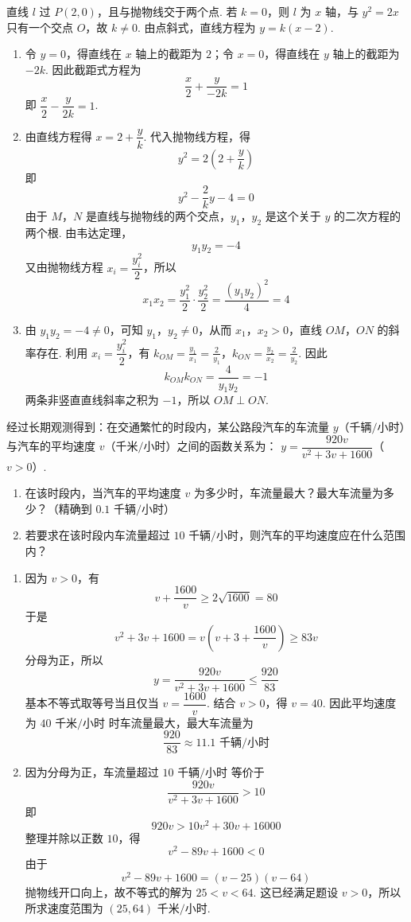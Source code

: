 \begin{solution}
直线 \(l\) 过 \(P(2,0)\)，且与抛物线交于两个点. 若 \(k=0\)，则 \(l\) 为 \(x\) 轴，与 \(y^2=2x\) 只有一个交点 \(O\)，故 \(k\ne0\). 由点斜式，直线方程为 \(y=k(x-2)\).

\begin{enumerate}
\item 令 \(y=0\)，得直线在 \(x\) 轴上的截距为 \(2\)；令 \(x=0\)，得直线在 \(y\) 轴上的截距为 \(-2k\). 因此截距式方程为
\[
\frac{x}{2}+\frac{y}{-2k}=1
\]
即 \(\dfrac{x}{2}-\dfrac{y}{2k}=1\).
\item 由直线方程得 \(x=2+\dfrac{y}{k}\). 代入抛物线方程，得
\[
y^2=2\left(2+\frac{y}{k}\right)
\]
即
\[
y^2-\frac{2}{k}y-4=0
\]
由于 \(M\)，\(N\) 是直线与抛物线的两个交点，\(y_1\)，\(y_2\) 是这个关于 \(y\) 的二次方程的两个根. 由韦达定理，
\[
y_1y_2=-4
\]
又由抛物线方程 \(x_i=\dfrac{y_i^2}{2}\)，所以
\[
x_1x_2=\frac{y_1^2}{2}\cdot\frac{y_2^2}{2}=\frac{(y_1y_2)^2}{4}=4
\]
\item 由 \(y_1y_2=-4\ne0\)，可知 \(y_1\)，\(y_2\ne0\)，从而 \(x_1\)，\(x_2>0\)，直线 \(OM\)，\(ON\) 的斜率存在. 利用 \(x_i=\dfrac{y_i^2}{2}\)，有
\(k_{OM}=\frac{y_1}{x_1}=\frac{2}{y_1}\)，\(k_{ON}=\frac{y_2}{x_2}=\frac{2}{y_2}\).
因此
\[
k_{OM}k_{ON}=\frac{4}{y_1y_2}=-1
\]
两条非竖直直线斜率之积为 \(-1\)，所以 \(OM\perp ON\).
\end{enumerate}
\end{solution}

\begin{problem}
经过长期观测得到：在交通繁忙的时段内，某公路段汽车的车流量 \(y\)（\(\text{千辆/小时}\)）与汽车的平均速度 \(v\)（\(\text{千米/小时}\)）之间的函数关系为：
\(y=\dfrac{920v}{v^2+3v+1600}\)（\(v>0\)）.

\begin{enumerate}
\item 在该时段内，当汽车的平均速度 \(v\) 为多少时，车流量最大？最大车流量为多少？（精确到 \(0.1\text{ 千辆/小时}\)）
\item 若要求在该时段内车流量超过 \(10\text{ 千辆/小时}\)，则汽车的平均速度应在什么范围内？
\end{enumerate}
\end{problem}

\begin{solution}
\begin{enumerate}
\item 因为 \(v>0\)，有
\[
v+\frac{1600}{v}\geq2\sqrt{1600}=80
\]
于是
\[
v^2+3v+1600=v\left(v+3+\frac{1600}{v}\right)\geq83v
\]
分母为正，所以
\[
y=\frac{920v}{v^2+3v+1600}\leq\frac{920}{83}
\]
基本不等式取等号当且仅当 \(v=\dfrac{1600}{v}\). 结合 \(v>0\)，得 \(v=40\). 因此平均速度为 \(40\text{ 千米/小时}\) 时车流量最大，最大车流量为
\[
\frac{920}{83}\approx11.1\text{ 千辆/小时}
\]
\item 因为分母为正，车流量超过 \(10\text{ 千辆/小时}\) 等价于
\[
\frac{920v}{v^2+3v+1600}>10
\]
即
\[
920v>10v^2+30v+16000
\]
整理并除以正数 \(10\)，得
\[
v^2-89v+1600<0
\]
由于
\[
v^2-89v+1600=(v-25)(v-64)
\]
抛物线开口向上，故不等式的解为 \(25<v<64\). 这已经满足题设 \(v>0\)，所以所求速度范围为 \((25,64)\text{ 千米/小时}\).
\end{enumerate}
\end{solution}

